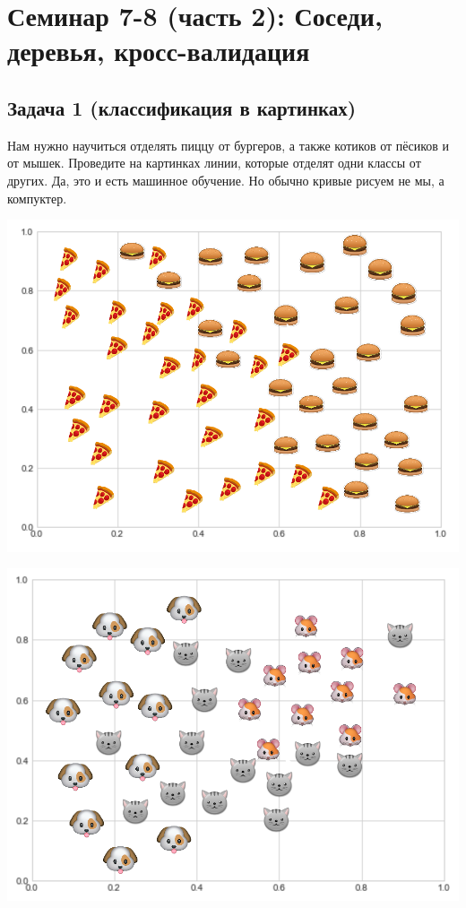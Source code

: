 \documentclass[12pt, a4paper, oneside]{article}
\begin{document}
	
\section*{Семинар 7-8 (часть 2):  Соседи, деревья, кросс-валидация}

\subsection*{Задача 1 (классификация в картинках)}

Нам нужно научиться отделять пиццу от бургеров, а также котиков от пёсиков и от мышек. Проведите на картинках линии, которые отделят одни классы от других.  Да, это и есть машинное обучение. Но обычно кривые рисуем не мы, а компуктер.

\begin{minipage}[t]{0.45\textwidth}
	\includegraphics[scale=0.21]{class_1.png}
\end{minipage}
\hfill
\begin{minipage}[t]{0.45\textwidth}
	\includegraphics[scale=0.21]{class_2.png}
\end{minipage}
\end{document}
